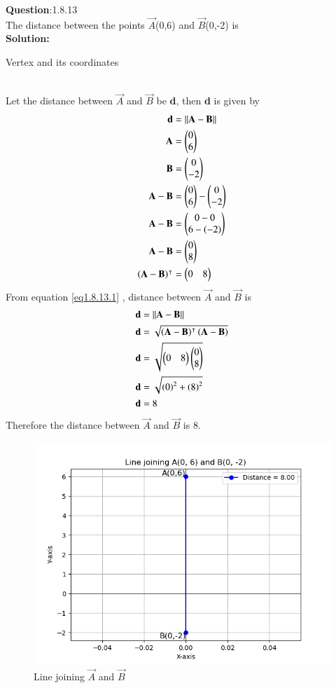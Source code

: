 \documentclass[journal]{IEEEtran}
\begin{document}
\textbf{Question}:1.8.13\\
The distance between the points $\vec{A}$(0,6) and $\vec{B}$(0,-2) is
\\
\textbf{Solution:}
\renewcommand{\tablename}{Table 1.8.13.1}
\begin{table}[h!]
  \centering
  
  \caption{Vertex and its coordinates}
\end{table}
\\
Let the distance between $\vec{A}$ and $\vec{B}$ be \textbf{d}, then \textbf{d} is given by
 \begin{align}
    \textbf{d} & = \lVert \mathbf{A} - \mathbf{B} \rVert \label{eq1.8.13.1} \\
    \mathbf{A} & = \begin{pmatrix}0 \\ 6\end{pmatrix} \\
    \mathbf{B} & = \begin{pmatrix}0 \\ -2\end{pmatrix} \\
    \mathbf{A} - \mathbf{B} & = \begin{pmatrix}0 \\ 6\end{pmatrix} - \begin{pmatrix}0 \\ -2\end{pmatrix} \\
    \mathbf{A} - \mathbf{B} & = \begin{pmatrix}0 - 0 \\ 6 - \left(-2\right)\end{pmatrix} \\
    \mathbf{A} - \mathbf{B} & = \begin{pmatrix}0 \\ 8\end{pmatrix} \\
    \left(\mathbf{A} - \mathbf{B}\right)^\intercal & = \begin{pmatrix}0 & 8\end{pmatrix}
 \end{align}
From equation \ref{eq1.8.13.1} , distance between $\vec{A}$ and $\vec{B}$ is 
\begin{align}
\textbf{d} & = \lVert \mathbf{A} - \mathbf{B} \rVert \\
   \textbf{d} & = \sqrt{\left(\mathbf{A} - \mathbf{B}\right)^\intercal\left(\mathbf{A} - \mathbf{B}\right)} \\
   \textbf{d} & = \sqrt{\begin{pmatrix}0 & 8\end{pmatrix} \begin{pmatrix}0 \\ 8\end{pmatrix}} \\
   \textbf{d} & = \sqrt{\left(0\right)^2 + \left(8\right)^2} \\
   \textbf{d} & = 8
\end{align}
Therefore the distance between $\vec{A}$ and $\vec{B}$ is 8.
\begin{figure}[h!]
   \centering
   \includegraphics[width=0.7\linewidth]{figs/dist.png}
	\caption{Line joining $\vec{A}$ and $\vec{B}$}
   \end{figure}
   
\end{document}
